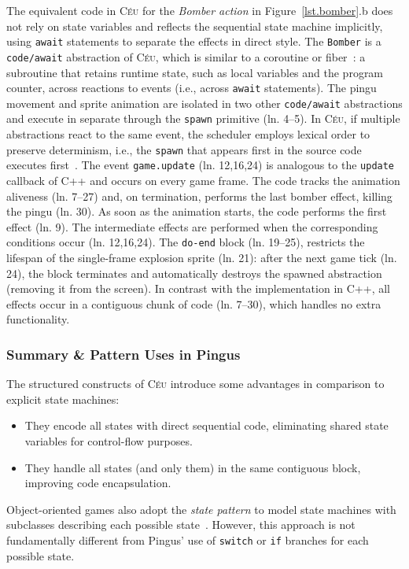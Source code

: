 \documentclass{vgtc}                          %
\newcommand{\CEU}{\textsc{C\'{e}u}\xspace}
\newcommand{\code}[1] {{\small{\texttt{#1}}}}
\begin{document}
The equivalent code in \CEU for the \emph{Bomber action} in
Figure~\ref{lst.bomber}.b does not rely on state variables and reflects the
sequential state machine implicitly, using \code{await} statements to separate
the effects in direct style.
%
The \code{Bomber} is a \code{code/await} abstraction of \CEU, which is similar
to a coroutine or fiber~\cite{sync_async.cooperative}: a subroutine that
retains runtime state, such as local variables and the program counter, across
reactions to events (i.e., across \code{await} statements).
The pingu movement and sprite animation are isolated in two other
\code{code/await} abstractions and execute in separate through the \code{spawn}
primitive (ln. 4--5).
In \CEU, if multiple abstractions react to the same event, the scheduler
employs lexical order to preserve determinism, i.e., the \code{spawn} that
appears first in the source code executes first~\cite{ceu.mod15}.
The event \code{game.update} (ln. 12,16,24) is analogous to the \code{update}
callback of C++ and occurs on every game frame.
%
The code tracks the animation aliveness (ln. 7--27) and, on termination,
performs the last bomber effect, killing the pingu (ln. 30).
As soon as the animation starts, the code performs the first effect (ln. 9).
The intermediate effects are performed when the corresponding conditions occur
(ln. 12,16,24).
The \code{do-end} block (ln. 19--25), restricts the lifespan of the
single-frame explosion sprite (ln. 21): after the next game tick (ln. 24), the
block terminates and automatically destroys the spawned abstraction (removing
it from the screen).
%
In contrast with the implementation in C++, all effects occur in a contiguous
chunk of code (ln. 7--30), which handles no extra functionality.

\subsubsection{Summary \& Pattern Uses in Pingus}

The structured constructs of \CEU introduce some advantages in comparison to 
explicit state machines:
%
\begin{itemize}
\item They encode all states with direct sequential code, eliminating shared
      state variables for control-flow purposes.
\item They handle all states (and only them) in the same contiguous block,
      improving code encapsulation.
\end{itemize}
%
Object-oriented games also adopt the \emph{state pattern} to model state
machines with subclasses describing each possible state~\cite{games.patterns}.
However, this approach is not fundamentally different from Pingus' use of
\code{switch} or \code{if} branches for each possible state.
\end{document}

